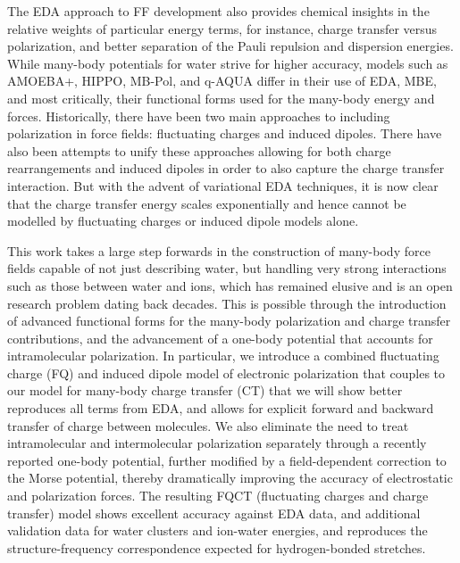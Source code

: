 \documentclass[journal=jctcce,manuscript=article]{achemso}
\begin{document}
The EDA approach to FF development also provides chemical insights in the relative weights of particular energy terms, for instance, charge transfer versus polarization, and better separation of the Pauli repulsion and dispersion energies. While many-body potentials for water strive for higher accuracy, models such as AMOEBA+, HIPPO\cite{rackers2021polarizable}, MB-Pol, and q-AQUA differ in their use of EDA, MBE, and most critically, their functional forms used for the many-body energy and forces. Historically, there have been two main approaches to including polarization in force fields: fluctuating charges\cite{rick1994dynamical} and induced dipoles\cite{applequist1985multipole}. There have also been attempts to unify these approaches allowing for both charge rearrangements and induced dipoles\cite{stern2001combined} in order to also capture the charge transfer interaction.\cite{rick1994dynamical} But with the advent of variational EDA  techniques\cite{khaliullin2007,horn2016probing,Mao:2021:EDA-review}, it is now clear that the charge transfer energy scales exponentially and hence cannot be modelled by fluctuating charges or induced dipole models alone.

This work takes a large step forwards in the construction of many-body force fields capable of not just describing water, but handling very strong interactions such as those between water and ions, which has remained elusive and is an open research problem dating back decades. This is possible through the introduction of advanced functional forms for the many-body polarization and charge transfer contributions, and the advancement of a one-body potential that accounts for intramolecular polarization. In particular, we introduce a combined fluctuating charge (FQ) and induced dipole model of electronic polarization that couples to our model for many-body charge transfer (CT) that we will show better reproduces all terms from EDA, and allows for explicit forward and backward transfer of charge between molecules. We also eliminate the need to treat intramolecular and intermolecular polarization separately through a recently reported one-body potential\cite{Sami2024}, further modified by a field-dependent correction to the Morse potential, thereby dramatically improving the accuracy of electrostatic and polarization forces. The resulting FQCT (fluctuating charges and charge transfer) model shows excellent accuracy against EDA data, and additional validation data for water clusters and ion-water energies, and reproduces the structure-frequency correspondence expected for hydrogen-bonded  stretches.\cite{boyer2019beyond}
\end{document}
